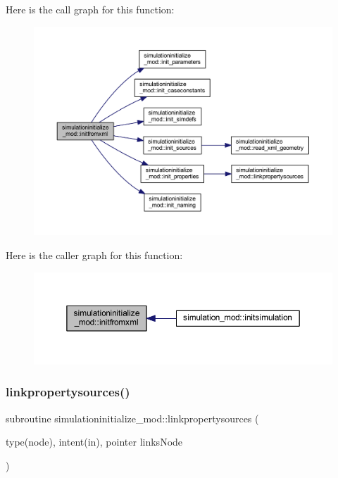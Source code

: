 Here is the call graph for this function\+:\nopagebreak
\begin{figure}[H]
\begin{center}
\leavevmode
\includegraphics[width=350pt]{namespacesimulationinitialize__mod_ada0310fe0d45fa2eec30deaf3ad25ba7_cgraph}
\end{center}
\end{figure}
Here is the caller graph for this function\+:\nopagebreak
\begin{figure}[H]
\begin{center}
\leavevmode
\includegraphics[width=350pt]{namespacesimulationinitialize__mod_ada0310fe0d45fa2eec30deaf3ad25ba7_icgraph}
\end{center}
\end{figure}
\mbox{\label{namespacesimulationinitialize__mod_aa4c1099b84c9901ab1286a3796a54f71}} 
\subsubsection{\texorpdfstring{linkpropertysources()}{linkpropertysources()}}
{\footnotesize\ttfamily subroutine simulationinitialize\+\_\+mod\+::linkpropertysources (\begin{DoxyParamCaption}\item[{type(node), intent(in), pointer}]{links\+Node }\end{DoxyParamCaption})\hspace{0.3cm}{\ttfamily [private]}}



